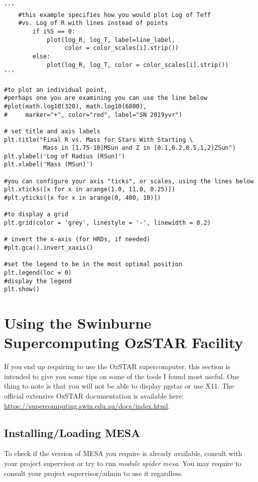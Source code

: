 \documentclass[12pt,hidelinks]{article}
\begin{document}
\begin{lstlisting}
'''
    #this example specifies how you would plot Log of Teff 
    #vs. Log of R with lines instead of points
        if i%5 == 0:
            plot(log_R, log_T, label=line_label, 
                 color = color_scales[i].strip())
        else:
            plot(log_R, log_T, color = color_scales[i].strip())
'''

#to plot an individual point, 
#perhaps one you are examining you can use the line below
#plot(math.log10(320), math.log10(6800), 
#     marker="+", color="red", label="SN 2019yvr")

# set title and axis labels
plt.title("Final R vs. Mass for Stars With Starting \
           Mass in [1.75-10]MSun and Z in [0.1,0.2,0.5,1,2]ZSun")
plt.ylabel('Log of Radius (RSun)')
plt.xlabel('Mass (MSun)')

#you can configure your axis "ticks", or scales, using the lines below
plt.xticks([x for x in arange(1.0, 11.0, 0.25)])
#plt.yticks([x for x in arange(0, 400, 10)])

#to display a grid
plt.grid(color = 'grey', linestyle = '-', linewidth = 0.2)

# invert the x-axis (for HRDs, if needed)
#plt.gca().invert_xaxis()

#set the legend to be in the most optimal position
plt.legend(loc = 0)
#display the legend
plt.show()

            \end{lstlisting}

	
\newpage
\section{Using the Swinburne Supercomputing OzSTAR Facility }
\vspace{10.5cm}
    If you end up requiring to use the OzSTAR supercomputer, this section is intended to give you some tips on some of the tools I found most useful. One thing to note is that you will not be able to display pgstar or use X11. 
    The official extensive OzSTAR documentation is available here: \url{https://supercomputing.swin.edu.au/docs/index.html}.
    
    \subsection{Installing/Loading MESA}
        To check if the version of MESA you require is already available, consult with your project supervisor or try to run \emph{module spider mesa}. You may require to consult your project supervisor/admin to use it regardless.
    
\end{document}

